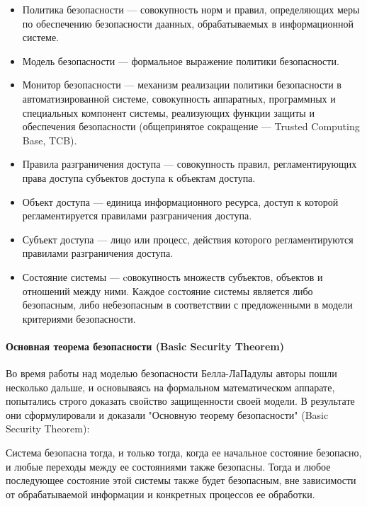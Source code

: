 \begin{itemize}
	\item Политика безопасности --- совокупность норм и правил, определяющих меры по обеспечению безопасности даанных, обрабатываемых в информационной системе.
	\item Модель безопасности --- формальное выражение политики безопасности.
	\item Монитор безопасности --- механизм реализации политики безопасности в автоматизированной системе, совокупность аппаратных, программных и специальных компонент системы, реализующих функции защиты и обеспечения безопасности (общепринятое сокращение --- Trusted Computing Base, TCB).
	\item Правила разграничения доступа --- совокупность правил, регламентирующих права доступа субъектов доступа к объектам доступа.
	\item Объект доступа --- единица информационного ресурса, доступ к которой регламентируется правилами разграничения доступа.
	\item Субъект доступа --- лицо или процесс, действия которого регламентируются правилами разграничения доступа.
	\item Состояние системы --- cовокупность множеств субъектов, объектов и отношений между ними. Каждое состояние системы является либо безопасным, либо небезопасным в соответствии с предложенными в модели критериями безопасности.
\end{itemize}

\paragraph{Основная теорема безопасности (Basic Security Theorem)}

Во время работы над моделью безопасности Белла-ЛаПадулы авторы пошли несколько дальше, и основываясь на формальном математическом аппарате, попытались строго доказать свойство защищенности своей модели. В результате они сформулировали и доказали "Основную теорему безопасности" (Basic Security Theorem):

\begin{grayquote}
Система безопасна тогда, и только тогда, когда ее начальное состояние безопасно, и любые переходы между ее состояниями также безопасны. Тогда и любое последующее состояние этой системы также будет безопасным, вне зависимости от обрабатываемой информации и конкретных процессов ее обработки.
\end{grayquote}

